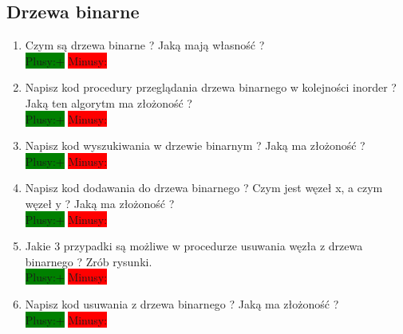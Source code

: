 \documentclass[a4paper,11pt]{article}
\begin{document}
\subsection{Drzewa binarne}
\begin{enumerate}
\item Czym są drzewa binarne ? Jaką mają własność ? \\ \colorbox{green}{Plusy:+} \colorbox{red}{Minusy: }

\item Napisz kod procedury przeglądania drzewa binarnego w kolejności inorder ? Jaką ten algorytm ma złożoność ? \\ 
\colorbox{green}{Plusy:+} \colorbox{red}{Minusy: }

\item Napisz kod wyszukiwania w drzewie binarnym ? Jaką ma złożoność ? \\ 
\colorbox{green}{Plusy:+} \colorbox{red}{Minusy: }

\item Napisz kod dodawania do drzewa binarnego ? Czym jest węzeł x, a czym węzeł  y ? Jaką ma złożoność ? 
\\ \colorbox{green}{Plusy:+} \colorbox{red}{Minusy: }

\item Jakie 3 przypadki są możliwe w procedurze usuwania węzła z drzewa binarnego ? Zrób rysunki. \\ 
\colorbox{green}{Plusy:+} \colorbox{red}{Minusy: }

\item Napisz kod usuwania z drzewa binarnego ? Jaką ma złożoność ? \\ \colorbox{green}{Plusy:+} \colorbox{red}{Minusy: } 

\end{enumerate}
\end{document}
